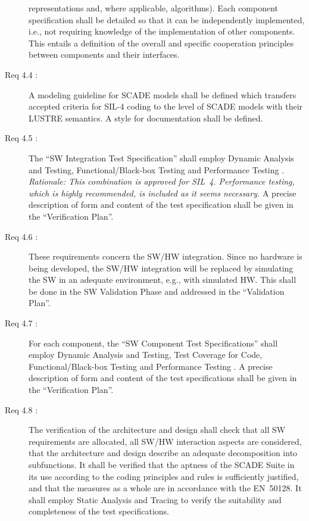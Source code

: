\documentclass{template/openetcs_article}
\begin{document}
\begin{description}
  representations and, where applicable, algorithms). Each component
  specification shall be detailed so that it can be independently
  implemented, i.e., not requiring knowledge of the implementation of other
  components. This entails a definition of the overall and specific
  cooperation principles between components and their interfaces. 
\item[Req 4.4 {\cite[7.3.4.25 to 7.4.3.28]{EN50128:2011}}:] A modeling
  guideline for SCADE models shall be defined which transfers accepted
  criteria for SIL-4 coding \cite[A.12]{EN50128:2011} to the level of
  SCADE models with their LUSTRE semantics. A style for documentation
  shall be defined.
\item[Req 4.5 {\cite[7.3.4.29 to 7.4.3.32]{EN50128:2011}}:] The ``SW
  Integration Test Specification'' shall employ Dynamic Analysis and
  Testing, Functional/Black-box Testing and Performance Testing
  \cite[A.5,A.6]{EN50128:2011}. \emph{Rationale: This combination is
    approved for SIL~4. Performance testing, which is highly
    recommended, is included as it seems necessary.} A precise
  description of form and content of the test specification shall be
  given in the ``Verification Plan''.
\item[Req 4.6 {\cite[7.3.4.33 to 7.3.4.39]{EN50128:2011}}:] These
  requirements concern the SW/HW integration. Since no
  hardware is being developed, the SW/HW integration will be replaced
  by simulating the SW in an adequate environment, e.g., with
  simulated HW. This shall be
  done in the SW Validation Phase and addressed in the ``Validation Plan''.
\item[Req 4.7 {\cite[7.4.4.7 to 7.4.4.10]{EN50128:2011}}:]
  For each component, the ``SW Component Test Specifications'' shall
  employ Dynamic Analysis and Testing, Test Coverage for Code,
  Functional/Black-box Testing and Performance Testing
  \cite[A.5]{EN50128:2011}.  A precise description of form and content
  of the test specifications shall be given in the ``Verification
  Plan''.
\item[Req 4.8 {\cite[7.3.4.40 to 7.3.4.43, Sec.~6.1.4]{EN50128:2011}}:]
  The verification of the architecture and design shall check that all
  SW requirements are allocated, all SW/HW interaction aspects are
  considered, that the architecture and design describe an adequate
  decomposition into subfunctions. It shall be verified that the
  aptness of the SCADE Suite in its use according to the coding
  principles and rules is sufficiently justified, and that the
  measures as a whole are in accordance with the EN~50128. It shall
  employ Static Analysis and Tracing to verify the suitability and
  completeness of the test specifications.
\end{description}
\end{document}
